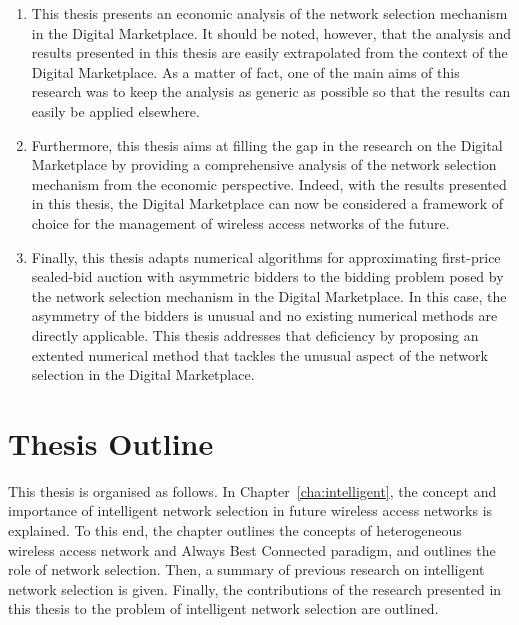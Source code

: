 \begin{enumerate}
\item This thesis presents an economic analysis of the network selection mechanism in the Digital Marketplace. It should be noted, however, that the analysis and results presented in this thesis are easily extrapolated from the context of the Digital Marketplace. As a matter of fact, one of the main aims of this research was to keep the analysis as generic as possible so that the results can easily be applied elsewhere.
\item Furthermore, this thesis aims at filling the gap in the research on the Digital Marketplace by providing a comprehensive analysis of the network selection mechanism from the economic perspective. Indeed, with the results presented in this thesis, the Digital Marketplace can now be considered a framework of choice for the management of wireless access networks of the future.
\item Finally, this thesis adapts numerical algorithms for approximating first-price sealed-bid auction with asymmetric bidders to the bidding problem posed by the network selection mechanism in the Digital Marketplace. In this case, the asymmetry of the bidders is unusual and no existing numerical methods are directly applicable. This thesis addresses that deficiency by proposing an extented numerical method that tackles the unusual aspect of the network selection in the Digital Marketplace.
\end{enumerate}

\section{Thesis Outline} %
\label{sec:thesis_outline_introduction}
This thesis is organised as follows. In Chapter~\ref{cha:intelligent}, the concept and importance of intelligent network selection in future wireless access networks is explained. To this end, the chapter outlines the concepts of heterogeneous wireless access network and Always Best Connected paradigm, and outlines the role of network selection. Then, a summary of previous research on intelligent network selection is given. Finally, the contributions of the research presented in this thesis to the problem of intelligent network selection are outlined.

